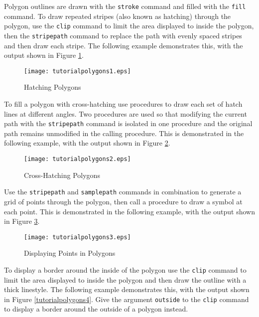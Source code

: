 Polygon outlines are drawn with the \texttt{stroke}
command and filled with the \texttt{fill} command.
To draw repeated stripes (also known as hatching) through
the polygon, use the \texttt{clip}
command to limit the area displayed to inside the polygon,
then the \texttt{stripepath}
command to replace the path with evenly spaced stripes and
then draw each stripe.  The following example demonstrates this,
with the output shown in Figure \ref{tutorialpolygons1}.



\begin{figure}[htb]
\texttt{[image: tutorialpolygons1.eps]}
\caption{Hatching Polygons}
\label{tutorialpolygons1}
\end{figure}

To fill a polygon with cross-hatching use procedures to
draw each set of hatch lines at different angles.  Two procedures
are used so that modifying the current path with the
\texttt{stripepath}
command is isolated in one procedure and the original path
remains unmodified in the calling procedure.
This is demonstrated in the following example, with the output
shown in Figure \ref{tutorialpolygons2}.



\begin{figure}[htb]
\texttt{[image: tutorialpolygons2.eps]}
\caption{Cross-Hatching Polygons}
\label{tutorialpolygons2}
\end{figure}

Use the \texttt{stripepath} and \texttt{samplepath}
commands in combination to generate a grid of points through the
polygon, then call a procedure to draw a symbol at each point.
This is demonstrated in the following example, with the output
shown in Figure \ref{tutorialpolygons3}.



\begin{figure}[htb]
\texttt{[image: tutorialpolygons3.eps]}
\caption{Displaying Points in Polygons}
\label{tutorialpolygons3}
\end{figure}

To display a border around the inside of the polygon
use the \texttt{clip}
command to limit the area displayed to inside the polygon
and then draw the outline with a thick linestyle.
The following example demonstrates this, with the output shown
in Figure \ref{tutorialpolygons4}.
Give the argument \texttt{outside}
to the \texttt{clip} command
to display a border around the outside of a polygon instead.

